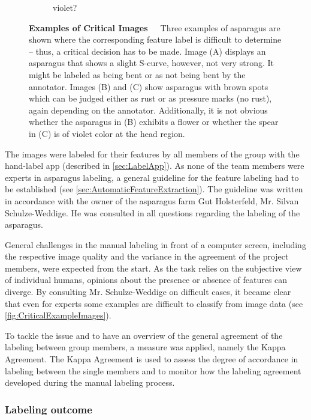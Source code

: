 \begin{figure}[!htb]
\begin{subfigure}{0.3\textwidth}
		\caption{violet?}
	\end{subfigure}
    \caption[Examples of Critical Images]{\textbf{Examples of Critical Images}~~~Three examples of asparagus are shown where the corresponding feature label is difficult to determine -- thus, a critical decision has to be made. Image (A) displays an asparagus that shows a slight S-curve, however, not very strong. It might be labeled as being bent or as not being bent by the annotator. Images (B) and (C) show asparagus with brown spots which can be judged either as rust or as pressure marks (no rust), again depending on the annotator. Additionally, it is not obvious whether the asparagus in (B) exhibits a flower or whether the spear in (C) is of violet color at the head region.}
    \label{fig:CriticalExampleImages}
\end{figure}

\bigskip
The images were labeled for their features by all members of the group with the hand-label app (described in \autoref{sec:LabelApp}). As none of the team members were experts in asparagus labeling, a general guideline for the feature labeling had to be established (see \autoref{sec:AutomaticFeatureExtraction}). The guideline was written in accordance with the owner of the asparagus farm Gut Holsterfeld, Mr. Silvan Schulze-Weddige. He was consulted in all questions regarding the labeling of the asparagus.

General challenges in the manual labeling in front of a computer screen, including the respective image quality and the variance in the agreement of the project members, were expected from the start. As the task relies on the subjective view of individual humans, opinions about the presence or absence of features can diverge. By consulting Mr. Schulze-Weddige on difficult cases, it became clear that even for experts some examples are difficult to classify from image data (see \autoref{fig:CriticalExampleImages}).

To tackle the issue and to have an overview of the general agreement of the labeling between group members, a measure was applied, namely the Kappa Agreement. The Kappa Agreement is used to assess the degree of accordance in labeling between the single members and to monitor how the labeling agreement developed during the manual labeling process. 


\subsubsection{Labeling outcome}
\label{subsec:SortingOutcome}

